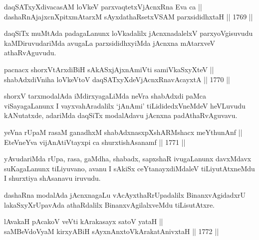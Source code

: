 \begin{shl}
daqSATxyXdivacasAM loVkeV parxvaqtetxVjAcnxRna Eva ca ||  \\
dashaRnAjajxcnXpitxmAtarxM sAyxdathaRsetxVSAM parxsididhxtaH \hfill || 1769 ||  
\end{shl}

\begin{artha}
daqSiTx muMtAda padagaLanunx loVkadalilx jAcnxnadalelxV parxyoVgisuvudu
kaMDiruvudariMda avugaLa parxsididhxyiMda jAcnxna mAtarxveV
athaRvAguvudu.
\end{artha}


\begin{shl}
pacnacx shorxVtArxdiBiH sAkASxjAjxnAmiVti samiVkaSxyXteV || \\
shabAdxdiVniha loVkeV\s toV daqSATxyXdeVjAcnxRnavAcayxtA \hfill || 1770 ||  
\end{shl}

\begin{artha}
shorxV tarxmodalAda iMdirxyagaLiMda neVra shabAdxdi paMca
viSayagaLanunx I vayxvahAradalilx `jAnAmi' tiLididedxVneMdeV
heVLuvudu kANutatxde, adariMda daqSiTx modalAdavu jAcnxna
padAthaRvAguvavu.
\end{artha}


\begin{shl}
yeVna rUpaM rasaM ganadhxM shabAdxnasxpXshARMshacx meYthunAnf || \\
EteVneYva vijAnAtiVtayxpi ca shurxtishAsanamf \hfill || 1771 ||  
\end{shl}

\begin{artha}
yAvudariMda rUpa, rasa, gaMdha, shabadx, sapxshaR ivugaLanunx davxMdavx
suKagaLanunx tiLiyuvano, avanu I sAkiSx ceYtanayxdiMdaleV
tiLiyutAtxneMdu I shurxtiya shAsanavu iruvudu.
\end{artha}

\begin{artha}
dashaRna modalAda jAcnxnagaLu vAcAyxthaRrUpadalilx BinanxvAgidadxrU
lakaSxyXrUpavAda athaRdalilx BinanxvAgilalxveMdu tiLisutAtxre.
\end{artha}

\begin{shl}
lAvakaH pAcakoV veVti kArakasayx satoV yataH || \\
saMBeVdoV\s yaM kirxyABiH sAyxnAnxtoV\s kArakatAnivxtaH \hfill || 1772 ||  
\end{shl}


